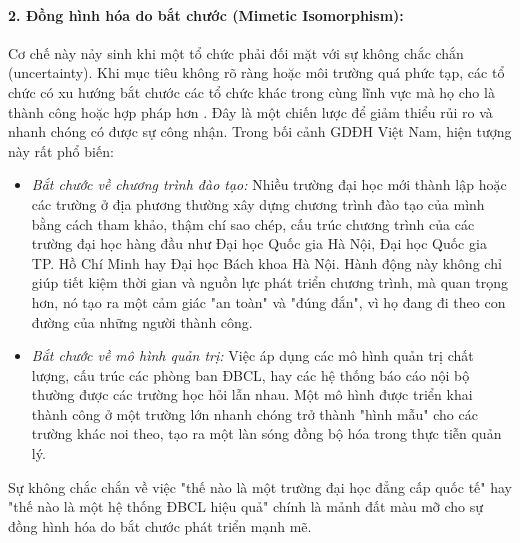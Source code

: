 \documentclass[12pt, a4paper, openany]{report}
\begin{document}
\paragraph{2. Đồng hình hóa do bắt chước (Mimetic Isomorphism):}
Cơ chế này nảy sinh khi một tổ chức phải đối mặt với sự không chắc chắn (uncertainty). Khi mục tiêu không rõ ràng hoặc môi trường quá phức tạp, các tổ chức có xu hướng bắt chước các tổ chức khác trong cùng lĩnh vực mà họ cho là thành công hoặc hợp pháp hơn \cite{DiMaggioPowell1983}. Đây là một chiến lược để giảm thiểu rủi ro và nhanh chóng có được sự công nhận. Trong bối cảnh GDĐH Việt Nam, hiện tượng này rất phổ biến:
\begin{itemize}
    \item \textit{Bắt chước về chương trình đào tạo:} Nhiều trường đại học mới thành lập hoặc các trường ở địa phương thường xây dựng chương trình đào tạo của mình bằng cách tham khảo, thậm chí sao chép, cấu trúc chương trình của các trường đại học hàng đầu như Đại học Quốc gia Hà Nội, Đại học Quốc gia TP. Hồ Chí Minh hay Đại học Bách khoa Hà Nội. Hành động này không chỉ giúp tiết kiệm thời gian và nguồn lực phát triển chương trình, mà quan trọng hơn, nó tạo ra một cảm giác "an toàn" và "đúng đắn", vì họ đang đi theo con đường của những người thành công.
    \item \textit{Bắt chước về mô hình quản trị:} Việc áp dụng các mô hình quản trị chất lượng, cấu trúc các phòng ban ĐBCL, hay các hệ thống báo cáo nội bộ thường được các trường học hỏi lẫn nhau. Một mô hình được triển khai thành công ở một trường lớn nhanh chóng trở thành "hình mẫu" cho các trường khác noi theo, tạo ra một làn sóng đồng bộ hóa trong thực tiễn quản lý.
\end{itemize}
Sự không chắc chắn về việc "thế nào là một trường đại học đẳng cấp quốc tế" hay "thế nào là một hệ thống ĐBCL hiệu quả" chính là mảnh đất màu mỡ cho sự đồng hình hóa do bắt chước phát triển mạnh mẽ.
\end{document}
